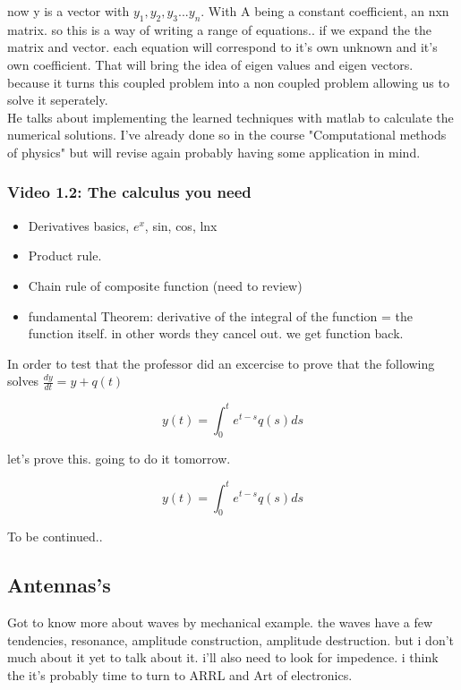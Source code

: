 \documentclass[12pt]{article}
\begin{document}
now y is a vector with $y_1, y_2, y_3... y_n$. With A being a constant coefficient, an nxn matrix. 
so this is a way of writing a range of equations.. if we expand the the matrix and vector. each equation will correspond to it's own unknown and it's own coefficient. 
That will bring the idea of eigen values and eigen vectors. because it turns this coupled problem into a non coupled problem allowing us to solve it seperately. 
\\He talks about implementing the learned techniques with matlab to calculate the numerical solutions. I've already done so in the course "Computational methods of physics" but will revise again probably having some application in mind. 


\subsubsection*{Video 1.2: The calculus you need}
\begin{itemize}
    \item Derivatives basics, $e^x$, sin, cos, lnx 
    \item Product rule. 
    \item Chain rule of composite function (need to review)
    \item fundamental Theorem: derivative of the integral of the function = the function itself. in other words they cancel out. we get function back.  
\end{itemize}

In order to test that the professor did an excercise to prove that the following solves $\frac{dy}{dt} = y + q(t)$
\begin{center}
    \begin{equation}
        y(t) = \int_{0}^{t}e^{t-s} q(s) ds
    \end{equation}
\end{center}
let's prove this. going to do it tomorrow. 

\begin{center}
    \begin{equation}
        y(t) = \int_{0}^{t}e^{t-s} q(s) ds
    \end{equation}
\end{center}

To be continued..


\subsection*{Antennas's}
Got to know more about waves by mechanical example. the waves have a few tendencies, resonance, amplitude construction, amplitude destruction. but i don't much about it yet to talk about it. 
i'll also need to look for impedence. i think the it's probably time to turn to ARRL and Art of electronics. 
\end{document}
